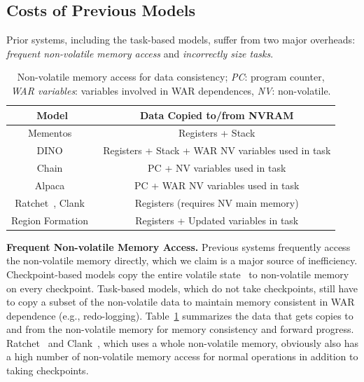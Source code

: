 \subsection{Costs of Previous Models}
\label{sec:cost_task-based}

Prior systems, including the task-based models, suffer from two major overheads:
{\em frequent non-volatile memory access} and {\em incorrectly size tasks}.

\begin{table}
	\centering
	\footnotesize
	\begin{tabular}{|c|c|}
		\hline
		Model & Data Copied to/from NVRAM \\
		\hline\hline
		Mementos~\cite{mementos}	& Registers + Stack     \\
		DINO~\cite{dino}	& Registers + Stack + WAR NV variables used in task\\
		Chain~\cite{chain}	& PC + NV variables used in task\\
		Alpaca~\cite{alpaca}	& PC + WAR NV variables used in task\\
		Ratchet~\cite{ratchet}, Clank~\cite{hicks_isca_2017} & Registers (requires NV main memory) \\
		Region Formation~\cite{baghsorkhi_cgo_2018} & Registers + Updated variables in task \\
		\hline
	\end{tabular}
	\caption{Non-volatile memory access for data consistency; \emph{PC}: program counter, \emph{WAR variables}: variables involved in WAR dependences, \emph{NV}: non-volatile.}
	\label{table:chechpoint_comparison}
\end{table}


\textbf{Frequent Non-volatile Memory Access.} 
Previous systems frequently access the non-volatile memory directly, which we claim is a major source of inefficiency.
Checkpoint-based models copy the entire volatile state~\cite{dino, mementos, ratchet, hicks_isca_2017} to non-volatile
memory on every checkpoint.
Task-based models, which do not take checkpoints, still have to copy a subset of the non-volatile data to maintain memory consistent in WAR dependence (e.g., redo-logging).
Table~\ref{table:chechpoint_comparison} summarizes the data that gets copies to and from the non-volatile memory for memory consistency and forward progress.
Ratchet~\cite{ratchet} and Clank~\cite{hicks_isca_2017}, which uses a whole non-volatile memory, obviously also has a high number of non-volatile memory access
for normal operations in addition to taking checkpoints.

